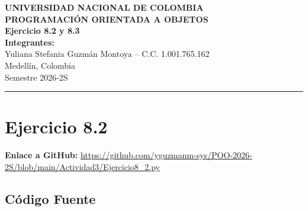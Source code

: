 \documentclass[12pt,letterpaper]{article}
\begin{document}
\begin{center}
    {\Large \textbf{UNIVERSIDAD NACIONAL DE COLOMBIA}} \\[0.5cm]
    {\large \textbf{PROGRAMACIÓN ORIENTADA A OBJETOS}} \\[0.3cm]
    {\Large \textbf{Ejercicio 8.2 y 8.3}} \\[1cm]
    
    \textbf{Integrantes:} \\[0.2cm]
    Yuliana Stefania Guzmán Montoya -- C.C. 1.001.765.162 \\[1cm]

    Medellín, Colombia \\[0.2cm]
    Semestre 2026-2S
\end{center}

\vspace{1cm}
\hrule
\vspace{1cm}

\section{Ejercicio 8.2}

\noindent\textbf{Enlace a GitHub:} \url{https://github.com/yguzmanm-sys/POO-2026-2S/blob/main/Actividad3/Ejercicio8_2.py}

\subsection{Código Fuente}
\end{document}
